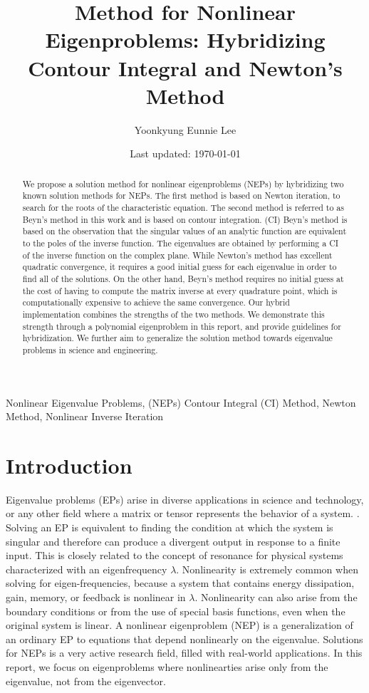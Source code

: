 \documentclass[11pt,letterpaper]{article}
\title{Method for Nonlinear Eigenproblems: Hybridizing Contour Integral and Newton's Method}
\author{Yoonkyung Eunnie Lee}
\date{Last updated: \today}
\begin{document}
\maketitle
\thispagestyle{empty}

\begin{abstract}
We propose a solution method for nonlinear eigenproblems (NEPs) by hybridizing two known solution methods for NEPs. The first method is based on Newton iteration, to search for the roots of the characteristic equation. The second method is referred to as Beyn's method in this work and is based on contour integration. (CI) Beyn's method is based on the observation that the singular values of an analytic function are equivalent to the poles of the inverse function. The eigenvalues are obtained by performing a CI of the inverse function on the complex plane.  
While Newton's method has excellent quadratic convergence, it requires a good initial guess for each eigenvalue in order to find all of the solutions. On the other hand, Beyn's method requires no initial guess at the cost of having to compute the matrix inverse at every quadrature point, which is computationally expensive to achieve the same convergence. Our hybrid implementation combines the strengths of the two methods. We demonstrate this strength through a polynomial eigenproblem in this report, and provide guidelines for hybridization. We further aim to generalize the solution method towards eigenvalue problems in science and engineering. 

\end{abstract}
Nonlinear Eigenvalue Problems, (NEPs) Contour Integral (CI) Method, Newton Method, Nonlinear Inverse Iteration
\section{Introduction} 
Eigenvalue problems (EPs) arise in diverse applications in science and technology, or any other field where a matrix or tensor represents the behavior of a system. \citep{guillaume_nonlinear_1999, betcke2013nlevp}. Solving an EP is equivalent to finding the condition at which the system is singular and therefore can produce a divergent output in response to a finite input. This is closely related to the concept of resonance for physical systems characterized with an eigenfrequency $\lambda$. Nonlinearity is extremely common when solving for eigen-frequencies, because a system that contains energy dissipation, gain, memory, or feedback is nonlinear in $\lambda$. Nonlinearity can also arise from the boundary conditions or from the use of special basis functions, even when the original system is linear. A nonlinear eigenproblem (NEP) is a generalization of an ordinary EP to equations that depend nonlinearly on the eigenvalue. Solutions for NEPs is a very active research field, filled with real-world applications. In this report, we focus on eigenproblems where nonlinearties arise only from the eigenvalue, not from the eigenvector.  
\end{document}

